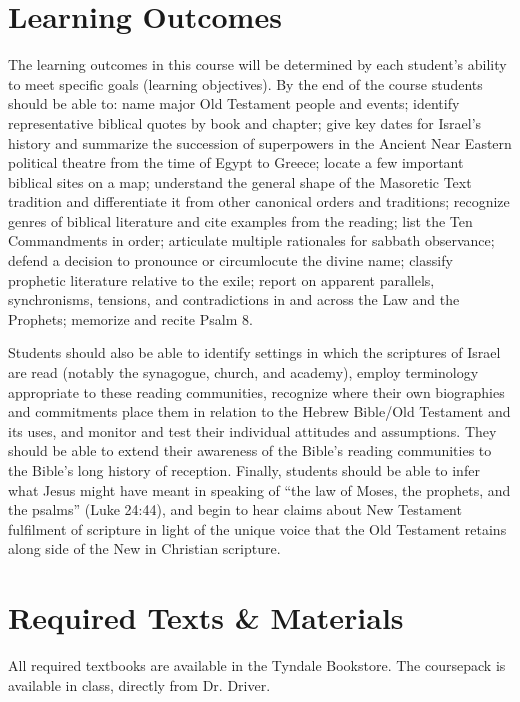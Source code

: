 \documentclass[titlepage]{article}
\newcommand\incl{../includes}
\begin{document}


\section{Learning Outcomes}
\label{outcomes}

The learning outcomes in this course will be determined by each
student's ability to meet specific goals (learning objectives). By the
end of the course students should be able to:
	name major Old Testament people and events;
	identify representative biblical quotes by book and chapter;
	give key dates for Israel's history and summarize the succession of superpowers in the Ancient Near Eastern political theatre from the time of Egypt to Greece;
	locate a few important biblical sites on a map;
	understand the general shape of the Masoretic Text tradition and differentiate it from other canonical orders and traditions;
	recognize genres of biblical literature and cite examples from the reading;
	list the Ten Commandments in order;
	articulate multiple rationales for sabbath observance;
	defend a decision to pronounce or circumlocute the divine name;
	classify prophetic literature relative to the exile;
	report on apparent parallels, synchronisms, tensions, and contradictions in and across the Law and the Prophets;
	memorize and recite Psalm 8.

Students should also be able to identify settings in which the
scriptures of Israel are read (notably the synagogue, church, and
academy), employ terminology appropriate to these reading communities,
recognize where their own biographies and commitments place them in
relation to the Hebrew Bible/Old Testament and its uses, and monitor and
test their individual attitudes and assumptions. They should be able to
extend their awareness of the Bible's reading communities to the Bible's
long history of reception. Finally, students should be able to infer
what Jesus might have meant in speaking of ``the law of Moses, the
prophets, and the psalms'' (Luke 24:44), and begin to hear claims about
New Testament fulfilment of scripture in light of the unique voice that
the Old Testament retains along side of the New in Christian scripture.

\section{Required Texts \& Materials}
\label{texts}

All required textbooks are available in the Tyndale Bookstore. The
coursepack is available in class, directly from Dr. Driver.
\end{document}
